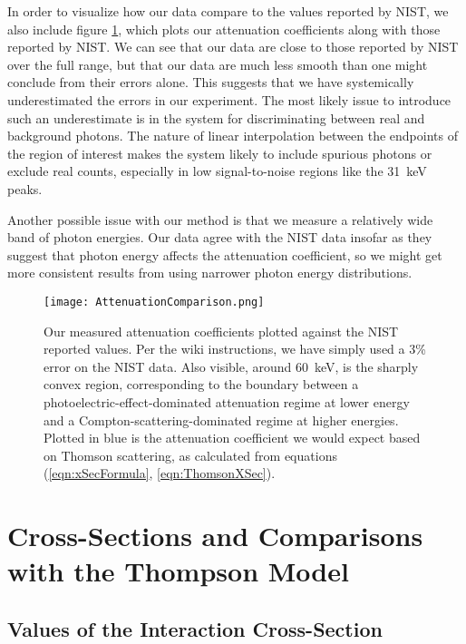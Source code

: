 \documentclass[letter]{article}
\begin{document}
In order to visualize how our data compare to the values reported by NIST, we also include figure \ref{fig:AttenComp}, which plots our attenuation coefficients along with those reported by NIST. We can see that our data are close to those reported by NIST over the full range, but that our data are much less smooth than one might conclude from their errors alone. This suggests that we have systemically underestimated the errors in our experiment. The most likely issue to introduce such an underestimate is in the system for discriminating between real and background photons. The nature of linear interpolation between the endpoints of the region of interest makes the system likely to include spurious photons or exclude real counts, especially in low signal-to-noise regions like the \qty{31}{\kilo\electronvolt} peaks.

Another possible issue with our method is that we measure a relatively wide band of photon energies. Our data agree with the NIST data insofar as they suggest that photon energy affects the attenuation coefficient, so we might get more consistent results from using narrower photon energy distributions.

\begin{figure}[h] \centering
    \texttt{[image: AttenuationComparison.png]}
    \caption{Our measured attenuation coefficients plotted against the NIST reported values. Per the wiki instructions, we have simply used a 3\% error on the NIST data. Also visible, around \qty{60}{\kilo\electronvolt}, is the sharply convex region, corresponding to the boundary between a photoelectric-effect-dominated attenuation regime at lower energy and a Compton-scattering-dominated regime at higher energies. Plotted in blue is the attenuation coefficient we would expect based on Thomson scattering, as calculated from equations (\ref{eqn:xSecFormula}, \ref{eqn:ThomsonXSec}).}
    \label{fig:AttenComp}
\end{figure}


\section{Cross-Sections and Comparisons with the Thompson Model}

\subsection{Values of the Interaction Cross-Section}
\end{document}
